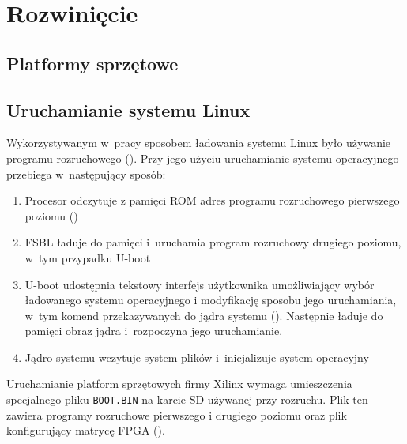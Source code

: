 \chapter{Rozwinięcie}
 
 \section{Platformy sprzętowe} 
  \label{sec:platformy_sprz_towe}
  
  
  
  
  
 \section{Uruchamianie systemu Linux} 
  \label{sec:uruchamianie_systemu_linux}
  
  Wykorzystywanym w~pracy sposobem ładowania systemu Linux było używanie programu rozruchowego  (). Przy jego użyciu uruchamianie systemu operacyjnego przebiega w~następujący sposób\cite{krid}:
  \begin{enumerate}
  	\item Procesor odczytuje z pamięci ROM adres programu rozruchowego pierwszego poziomu  ()
  	\item FSBL ładuje do pamięci i~uruchamia program rozruchowy drugiego poziomu, w~tym przypadku U-boot
  	\item U-boot udostępnia tekstowy interfejs użytkownika umożliwiający wybór ładowanego systemu operacyjnego i modyfikację sposobu jego uruchamiania, w~tym komend przekazywanych do jądra systemu (). Następnie ładuje do pamięci obraz jądra i~rozpoczyna jego uruchamianie.
  	\item Jądro systemu wczytuje system plików i~inicjalizuje system operacyjny
  \end{enumerate}
  
  Uruchamianie platform sprzętowych firmy Xilinx wymaga umieszczenia specjalnego pliku \texttt{BOOT.BIN} na karcie SD używanej przy rozruchu. Plik ten zawiera programy rozruchowe pierwszego i drugiego poziomu oraz plik konfigurujący matrycę FPGA (). 
  
